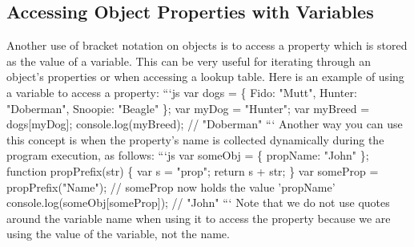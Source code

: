 \documentclass{article}%
\begin{document}
%
\subsection{Accessing Object Properties with Variables}%
\label{subsec:AccessingObjectPropertieswithVariables}%
Another use of bracket notation on objects is to access a property which is stored as the value of a variable. This can be very useful for iterating through an object's properties or when accessing a lookup table.\newline%
Here is an example of using a variable to access a property:\newline%
```js\newline%
var dogs = \{\newline%
  Fido: "Mutt",  Hunter: "Doberman",  Snoopie: "Beagle"\newline%
\};\newline%
var myDog = "Hunter";\newline%
var myBreed = dogs{[}myDog{]};\newline%
console.log(myBreed); // "Doberman"\newline%
```\newline%
Another way you can use this concept is when the property's name is collected dynamically during the program execution, as follows:\newline%
```js\newline%
var someObj = \{\newline%
  propName: "John"\newline%
\};\newline%
function propPrefix(str) \{\newline%
  var s = "prop";\newline%
  return s + str;\newline%
\}\newline%
var someProp = propPrefix("Name"); // someProp now holds the value 'propName'\newline%
console.log(someObj{[}someProp{]}); // "John"\newline%
```\newline%
Note that we do not use quotes around the variable name when using it to access the property because we are using the value of the variable, not the name.\newline%

%
\end{document}
